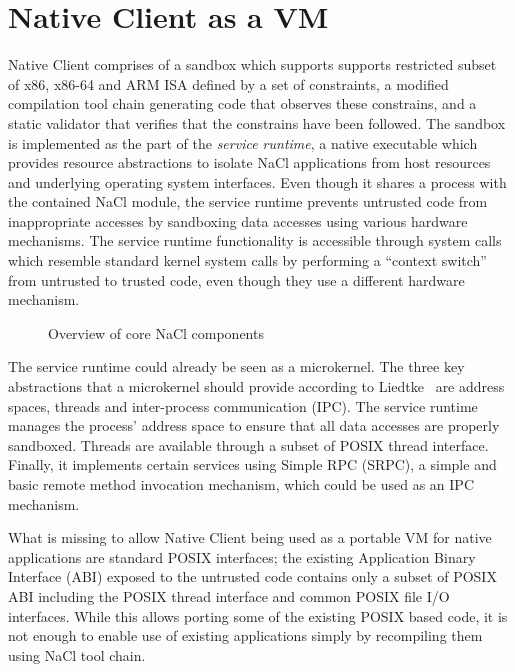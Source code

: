 \section{Native Client as a VM}
\label{sec:overview}

Native Client comprises of a sandbox which supports supports restricted
subset of x86, x86-64 and ARM ISA defined by a set of constraints, a
modified compilation tool chain generating code that observes these
constrains, and a static validator that verifies that the constrains
have been followed.  The sandbox is implemented as the part of the
\emph{service runtime}, a native executable which provides resource
abstractions to isolate NaCl applications from host resources and
underlying operating system interfaces. Even though it shares a process
with the contained NaCl module, the service runtime prevents untrusted
code from inappropriate accesses by sandboxing data accesses using
various hardware mechanisms. The service runtime functionality is
accessible through system calls which resemble standard kernel system
calls by performing a ``context switch'' from untrusted to trusted code,
even though they use a different hardware mechanism.


\begin{figure}
\centering
\caption{Overview of core NaCl components}
\label{fig:overview}
\end{figure}

The service runtime could already be seen as a microkernel. The three key
abstractions that a microkernel should provide according to
Liedtke~\cite{liedtke:sosp93} are address spaces, threads and
inter-process communication (IPC). The service runtime manages the
process' address space to ensure that all data accesses are properly
sandboxed.  Threads are available through a subset of POSIX thread
interface.  Finally, it implements certain services using Simple RPC
(SRPC), a simple and basic remote method invocation mechanism, which
could be used as an IPC mechanism. 

What is missing to allow Native Client being used as a portable VM for
native applications are standard POSIX interfaces; the existing
Application Binary Interface (ABI) exposed to the untrusted code
contains only a subset of POSIX ABI including the POSIX thread interface
and common POSIX file I/O interfaces. While this allows porting some of
the existing POSIX based code, it is not enough to enable use of
existing applications simply by recompiling them using NaCl tool chain.

